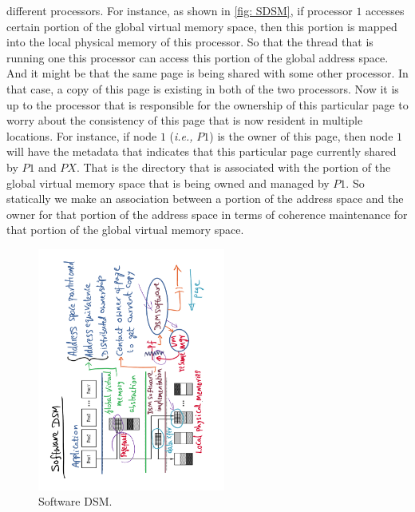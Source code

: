 \documentclass[11pt]{lecture}
\def\fullsize{0.55\textwidth}
\begin{document}
different processors. For instance, as shown in \autoref{fig: SDSM}, if processor $1$ accesses certain portion 
of the global virtual memory space, then this portion is mapped into the local physical memory of this processor. 
So that the thread that is running one this processor can access this portion of the global address space. 
And it might be that the same page is being shared with some other processor. In that case, a copy of this 
page is existing in both of the two processors. Now it is up to the processor that is responsible for the ownership 
of this particular page to worry about the consistency of this page that is now resident in multiple 
locations. For instance, if node $1$ ({\it i.e.,} $P1$) is the owner of this page, then node $1$ will have the metadata that 
indicates that this particular page currently shared by $P1$ and $PX$. That is the directory that is 
associated with the portion of the global virtual memory space that is being 
owned and managed by $P1$. So statically we make an association between a portion of the address space and 
the owner for that portion of the address space in terms of coherence maintenance for that portion of 
the global virtual memory space. 

\begin{figure}[!htbp]
\centering
\includegraphics[width=\fullsize,angle=-90]{Figures/SoftDSM}
\caption{Software DSM.}\label{fig: SDSM}
\end{figure}
\end{document}
